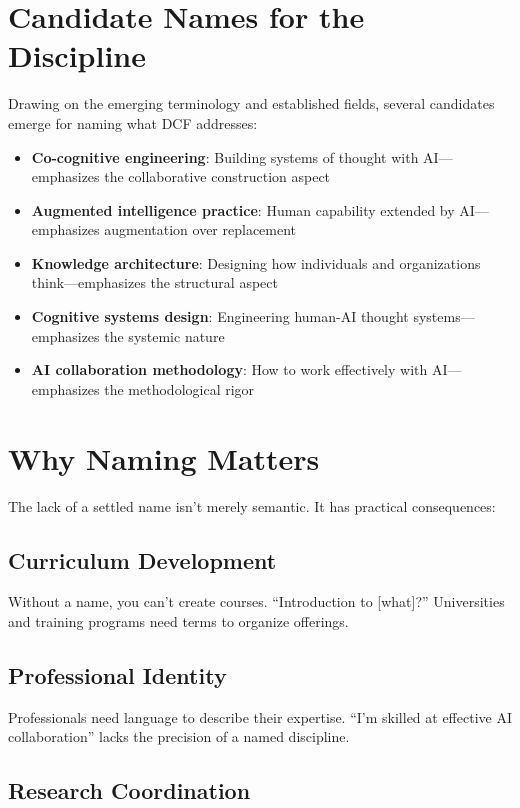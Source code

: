 \section{Candidate Names for the Discipline}

Drawing on the emerging terminology and established fields, several candidates emerge for naming what DCF addresses:

\begin{itemize}
    \item \textbf{Co-cognitive engineering}: Building systems of thought with AI---emphasizes the collaborative construction aspect
    \item \textbf{Augmented intelligence practice}: Human capability extended by AI---emphasizes augmentation over replacement
    \item \textbf{Knowledge architecture}: Designing how individuals and organizations think---emphasizes the structural aspect
    \item \textbf{Cognitive systems design}: Engineering human-AI thought systems---emphasizes the systemic nature
    \item \textbf{AI collaboration methodology}: How to work effectively with AI---emphasizes the methodological rigor
\end{itemize}

\section{Why Naming Matters}

The lack of a settled name isn't merely semantic. It has practical consequences:

\subsection{Curriculum Development}

Without a name, you can't create courses. ``Introduction to [what]?'' Universities and training programs need terms to organize offerings.

\subsection{Professional Identity}

Professionals need language to describe their expertise. ``I'm skilled at effective AI collaboration'' lacks the precision of a named discipline.

\subsection{Research Coordination}

